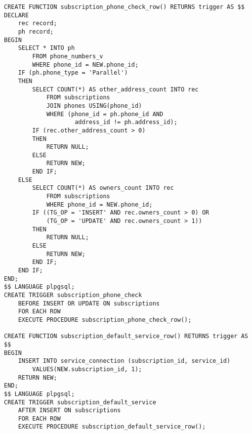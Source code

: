 \documentclass{report}
\begin{document}
\begin{lstlisting}
CREATE FUNCTION subscription_phone_check_row() RETURNS trigger AS $$
DECLARE
    rec record;
    ph record;
BEGIN
    SELECT * INTO ph 
        FROM phone_numbers_v 
        WHERE phone_id = NEW.phone_id;
    IF (ph.phone_type = 'Parallel')
    THEN
        SELECT COUNT(*) AS other_address_count INTO rec 
            FROM subscriptions 
            JOIN phones USING(phone_id)
            WHERE (phone_id = ph.phone_id AND 
                    address_id != ph.address_id);
        IF (rec.other_address_count > 0)
        THEN 
            RETURN NULL;
        ELSE 
            RETURN NEW;
        END IF;
    ELSE
        SELECT COUNT(*) AS owners_count INTO rec 
            FROM subscriptions 
            WHERE phone_id = NEW.phone_id;
        IF ((TG_OP = 'INSERT' AND rec.owners_count > 0) OR 
            (TG_OP = 'UPDATE' AND rec.owners_count > 1))
        THEN 
            RETURN NULL;
        ELSE 
            RETURN NEW;
        END IF;
    END IF;
END;
$$ LANGUAGE plpgsql;
CREATE TRIGGER subscription_phone_check 
    BEFORE INSERT OR UPDATE ON subscriptions
    FOR EACH ROW 
    EXECUTE PROCEDURE subscription_phone_check_row();

CREATE FUNCTION subscription_default_service_row() RETURNS trigger AS $$
BEGIN
    INSERT INTO service_connection (subscription_id, service_id)
        VALUES(NEW.subscription_id, 1);
    RETURN NEW;
END;
$$ LANGUAGE plpgsql;
CREATE TRIGGER subscription_default_service
    AFTER INSERT ON subscriptions
    FOR EACH ROW 
    EXECUTE PROCEDURE subscription_default_service_row();
\end{lstlisting}
\end{document}
